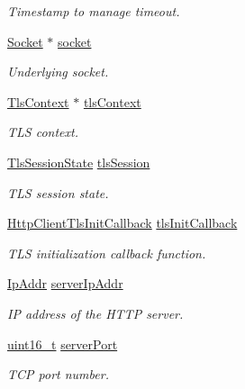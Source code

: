 \begin{DoxyCompactItemize}
\begin{DoxyCompactList}\small\item\em Timestamp to manage timeout. \end{DoxyCompactList}\item 
\hyperlink{socket_8h_aa85acfb0fa336ef495e6ba87fb88fc48}{Socket} $\ast$ \hyperlink{struct__HttpClientContext_a72686bbb7eb9487b455050c7a4cb65fb}{socket}
\begin{DoxyCompactList}\small\item\em Underlying socket. \end{DoxyCompactList}\item 
\hyperlink{tls_8h_ac09f7a286c0cdf9b07ee1edd107946f5}{Tls\+Context} $\ast$ \hyperlink{struct__HttpClientContext_af79c22926c55f364ea95555d10f085fc}{tls\+Context}
\begin{DoxyCompactList}\small\item\em T\+LS context. \end{DoxyCompactList}\item 
\hyperlink{structTlsSessionState}{Tls\+Session\+State} \hyperlink{struct__HttpClientContext_ae1e74e5f344a7f9a16e4194a5ebc8e65}{tls\+Session}
\begin{DoxyCompactList}\small\item\em T\+LS session state. \end{DoxyCompactList}\item 
\hyperlink{http__client_8h_a7627ce7ef31eba950fa770eceb5a4cf2}{Http\+Client\+Tls\+Init\+Callback} \hyperlink{struct__HttpClientContext_aefc12f45bc5f1477bd521b6866a0b6d9}{tls\+Init\+Callback}
\begin{DoxyCompactList}\small\item\em T\+LS initialization callback function. \end{DoxyCompactList}\item 
\hyperlink{structIpAddr}{Ip\+Addr} \hyperlink{struct__HttpClientContext_a25234fdea69a2f458cc41d7639300f9f}{server\+Ip\+Addr}
\begin{DoxyCompactList}\small\item\em IP address of the H\+T\+TP server. \end{DoxyCompactList}\item 
\hyperlink{stdint_8h_a273cf69d639a59973b6019625df33e30}{uint16\+\_\+t} \hyperlink{struct__HttpClientContext_a04d611c9be165914c456d12880eae695}{server\+Port}
\begin{DoxyCompactList}\small\item\em T\+CP port number. \end{DoxyCompactList}\item 

\end{DoxyCompactItemize}
